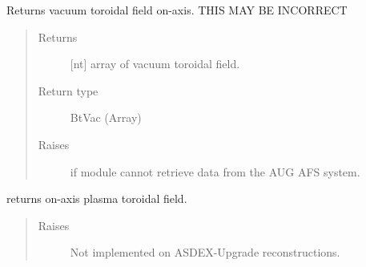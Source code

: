 \documentclass[letterpaper,10pt,english]{sphinxmanual}
\begin{document}
\begin{fulllineitems}
\begin{fulllineitems}
\begin{quote}
\begin{description}
\end{description}\end{quote}

\end{fulllineitems}


\begin{fulllineitems}
\label{\detokenize{eqtools:eqtools.AUGData.AUGDDData.getBtVac}}
Returns vacuum toroidal field on-axis. THIS MAY BE INCORRECT
\begin{quote}\begin{description}
\item[{Returns}] \leavevmode
{[}nt{]} array of vacuum toroidal field.

\item[{Return type}] \leavevmode
BtVac (Array)

\item[{Raises}] \leavevmode
{} \textendash{} if module cannot retrieve data from the AUG AFS system.

\end{description}\end{quote}

\end{fulllineitems}


\begin{fulllineitems}
\label{\detokenize{eqtools:eqtools.AUGData.AUGDDData.getBtPla}}
returns on-axis plasma toroidal field.
\begin{quote}\begin{description}
\item[{Raises}] \leavevmode
{} \textendash{} Not implemented on ASDEX-Upgrade reconstructions.

\end{description}\end{quote}

\end{fulllineitems}



\end{fulllineitems}
\end{document}
